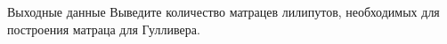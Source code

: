 Выходные данные
Выведите количество матрацев лилипутов, необходимых для построения матраца для Гулливера.